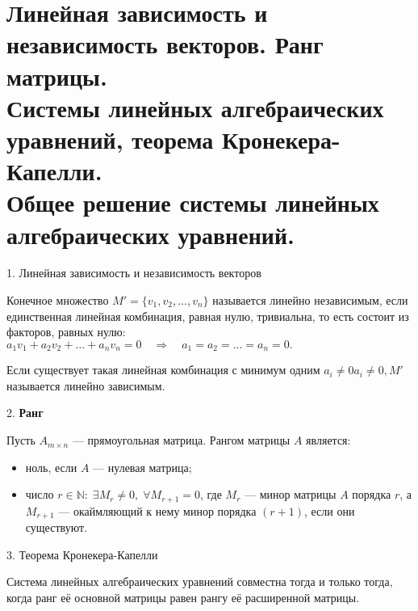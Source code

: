 \section{
    Линейная зависимость и независимость векторов. Ранг матрицы. \\
    Системы линейных алгебраических уравнений, теорема Кронекера-Капелли. \\ 
    Общее решение системы линейных алгебраических уравнений. 
}

1. Линейная зависимость и независимость векторов

Конечное множество ${\displaystyle M'=\{v_{1},v_{2},...,v_{n}\}}$ называется линейно
 независимым, если единственная линейная комбинация, равная нулю, тривиальна, 
 то есть состоит из факторов, равных нулю:
${\displaystyle a_{1}v_{1}+a_{2}v_{2}+\ldots +a_{n}v_{n}=0\quad \Rightarrow \quad a_{1}=a_{2}=\ldots =a_{n}=0.}$

Если существует такая линейная комбинация с минимум одним
${\displaystyle a_{i}\neq 0}a_{i}\neq 0, {\displaystyle M'}$ называется линейно зависимым.

2. \textbf{Ранг}

Пусть ${\displaystyle A_{m\times n}}$ — прямоугольная матрица. Рангом матрицы ${\displaystyle A}$ является:
\begin{itemize}
    \item ноль, если ${\displaystyle A}$ — нулевая матрица;
    \item число ${\displaystyle r\in \mathbb {N} :\;\exists M_{r}\neq 0,\;\forall M_{r+1}=0}$, 
    где ${\displaystyle M_{r}}$ — минор матрицы ${\displaystyle A}$ порядка ${\displaystyle r}$, 
    а ${\displaystyle M_{r+1}}$ — окаймляющий к нему минор порядка ${\displaystyle (r+1)}$, 
    если они существуют.
\end{itemize}

3. Теорема Кронекера-Капелли

Система линейных алгебраических уравнений совместна тогда и только тогда, когда ранг её основной матрицы равен рангу её расширенной матрицы.